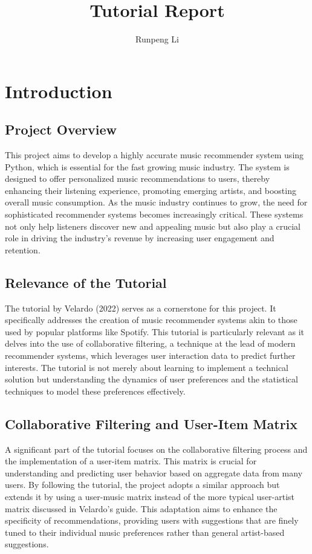 \documentclass[10pt,twocolumn]{article}
\title{Tutorial Report}
\author{Runpeng Li}
\affiliation{Occidental College}
\begin{document}
\maketitle

\section{Introduction}
\subsection{Project Overview}
This project aims to develop a highly accurate music recommender system using Python, which is essential for the fast growing music industry. The system is designed to offer personalized music recommendations to users, thereby enhancing their listening experience, promoting emerging artists, and boosting overall music consumption. As the music industry continues to grow, the need for sophisticated recommender systems becomes increasingly critical. These systems not only help listeners discover new and appealing music but also play a crucial role in driving the industry's revenue by increasing user engagement and retention.

\subsection{Relevance of the Tutorial}
The tutorial by Velardo (2022) serves as a cornerstone for this project. It specifically addresses the creation of music recommender systems akin to those used by popular platforms like Spotify. This tutorial is particularly relevant as it delves into the use of collaborative filtering, a technique at the lead of modern recommender systems, which leverages user interaction data to predict further interests. The tutorial is not merely about learning to implement a technical solution but understanding the dynamics of user preferences and the statistical techniques to model these preferences effectively.

\subsection{Collaborative Filtering and User-Item Matrix}
A significant part of the tutorial focuses on the collaborative filtering process and the implementation of a user-item matrix. This matrix is crucial for understanding and predicting user behavior based on aggregate data from many users. By following the tutorial, the project adopts a similar approach but extends it by using a user-music matrix instead of the more typical user-artist matrix discussed in Velardo’s guide. This adaptation aims to enhance the specificity of recommendations, providing users with suggestions that are finely tuned to their individual music preferences rather than general artist-based suggestions.
\end{document}
